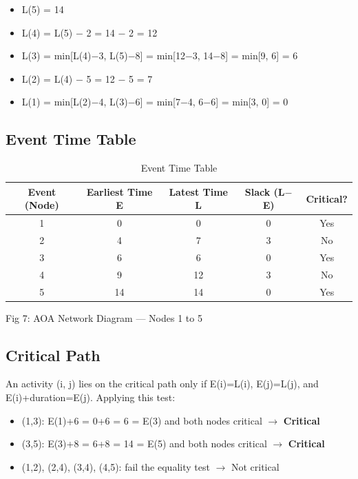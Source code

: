 \documentclass[10pt,a4paper]{article}
\begin{document}
\begin{itemize}[nosep]
    \item L(5) = 14
    \item L(4) = L(5) $-$ 2 = 14 $-$ 2 = 12
    \item L(3) = min[L(4)$-$3, L(5)$-$8] = min[12$-$3, 14$-$8] = min[9, 6] = 6
    \item L(2) = L(4) $-$ 5 = 12 $-$ 5 = 7
    \item L(1) = min[L(2)$-$4, L(3)$-$6] = min[7$-$4, 6$-$6] = min[3, 0] = 0
\end{itemize}

\subsection*{Event Time Table}

\begin{table}[h!]
\centering
\renewcommand{\arraystretch}{1.15}
\begin{tabular}{|c|c|c|c|c|}
\hline
\textbf{Event (Node)} & \textbf{Earliest Time E} & \textbf{Latest Time L} & \textbf{Slack (L$-$E)} & \textbf{Critical?} \\ \hline
1 & 0 & 0 & 0 & Yes \\ \hline
2 & 4 & 7 & 3 & No \\ \hline
3 & 6 & 6 & 0 & Yes \\ \hline
4 & 9 & 12 & 3 & No \\ \hline
5 & 14 & 14 & 0 & Yes \\ \hline
\end{tabular}
\caption*{Event Time Table}
\end{table}

Fig 7: AOA Network Diagram --- Nodes 1 to 5

\subsection*{Critical Path}

An activity (i, j) lies on the critical path only if E(i)=L(i), E(j)=L(j), and E(i)+duration=E(j). Applying this test:

\begin{itemize}[nosep]
    \item (1,3): E(1)+6 = 0+6 = 6 = E(3) and both nodes critical $\to$ \textbf{Critical}
    \item (3,5): E(3)+8 = 6+8 = 14 = E(5) and both nodes critical $\to$ \textbf{Critical}
    \item (1,2), (2,4), (3,4), (4,5): fail the equality test $\to$ Not critical
\end{itemize}
\end{document}
